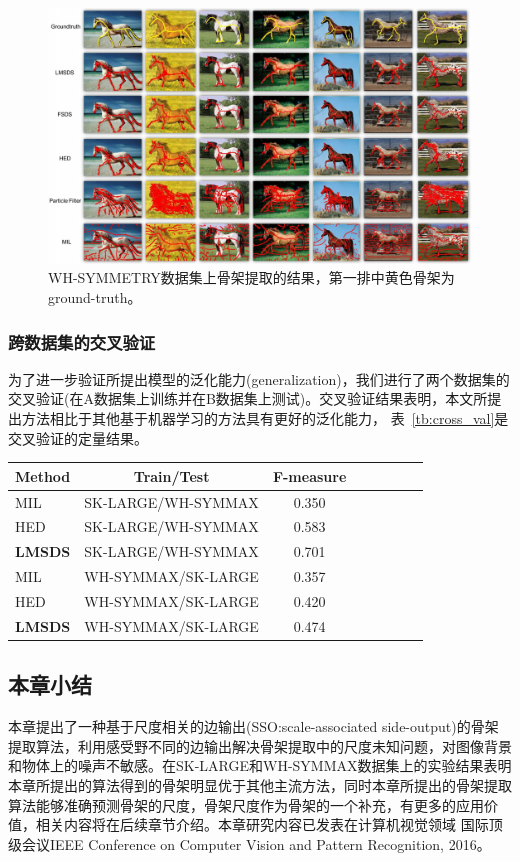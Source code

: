 \documentclass[UTF8]{ctexart}
\numberwithin{equation}{section} %
\numberwithin{table}{section} %
\begin{document}
\begin{figure}[!htb]
\centering
\includegraphics[scale=0.25]{figures/examples_wh.png}
\caption{WH-SYMMETRY数据集上骨架提取的结果，第一排中黄色骨架为ground-truth。}
\label{fig:examples_wh}
\end{figure}

\subsubsection{跨数据集的交叉验证}
为了进一步验证所提出模型的泛化能力(generalization)，我们进行了两个数据集的交叉验证(在A数据集上训练并在B数据集上测试)。交叉验证结果表明，本文所提出方法相比于其他基于机器学习的方法具有更好的泛化能力，
表~\ref{tb:cross_val}是交叉验证的定量结果。
\begin{center}
\begin{tabular}{l*{6}{c}r}
Method            & Train/Test & F-measure \\
\hline
MIL~\cite{tsogkas2012learning} & SK-LARGE/WH-SYMMAX & 0.350 \\
HED~\cite{xie2015holistically} & SK-LARGE/WH-SYMMAX & 0.583 \\
\textbf{LMSDS}                 & SK-LARGE/WH-SYMMAX & 0.701 \\
\hline
MIL~\cite{tsogkas2012learning} & WH-SYMMAX/SK-LARGE & 0.357 \\
HED~\cite{xie2015holistically} & WH-SYMMAX/SK-LARGE & 0.420 \\
\textbf{LMSDS}                 & WH-SYMMAX/SK-LARGE & 0.474 \\
\hline
\end{tabular}
\label{tb:cross_val}
\end{center}
\subsection{本章小结}
本章提出了一种基于尺度相关的边输出(SSO:scale-associated side-output)的骨架提取算法，利用感受野不同的边输出解决骨架提取中的尺度未知问题，对图像背景和物体上的噪声不敏感。在SK-LARGE和WH-SYMMAX数据集上的实验结果表明
本章所提出的算法得到的骨架明显优于其他主流方法，同时本章所提出的骨架提取算法能够准确预测骨架的尺度，骨架尺度作为骨架的一个补充，有更多的应用价值，相关内容将在后续章节介绍。本章研究内容已发表在计算机视觉领域
国际顶级会议IEEE Conference on Computer Vision and Pattern Recognition, 2016。
\end{document}
